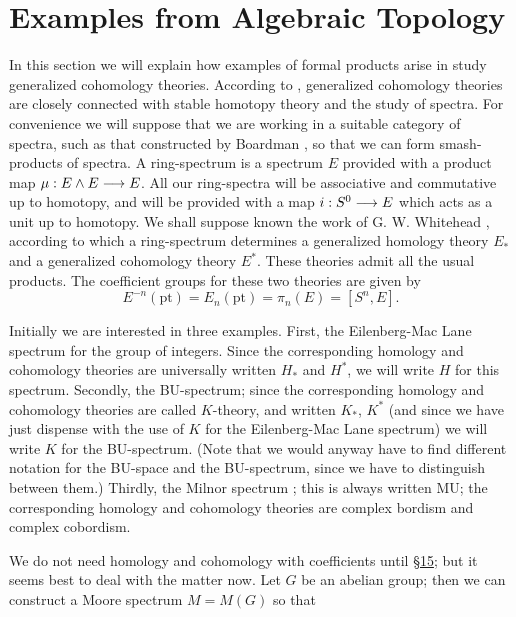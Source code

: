 \documentclass[../main]{subfiles}
\begin{document}
\label{sec:p2c2}

\chapter{Examples from Algebraic Topology}
In this section we will explain how examples of formal products arise in study generalized cohomology theories. According to \cite{whitehead}, generalized cohomology theories are closely connected with stable homotopy theory and the study of spectra. For convenience we will suppose that we are working in a suitable category of spectra, such as that constructed by Boardman \cite{boardman,boardman2}, so that we can form smash-products of spectra. A ring-spectrum is a spectrum $E$ provided with a product map $\mu : E \wedge E \overset{}{\longrightarrow} E$. All our ring-spectra will be associative and commutative up to homotopy, and will be provided with a map $i : S^0 \overset{}{\longrightarrow} E$ which acts as a unit up to homotopy. We shall suppose known the work of G. W. Whitehead \cite{whitehead}, according to which a ring-spectrum determines a generalized homology theory $E_\ast$ and a generalized cohomology theory $E^\ast$. These theories admit all the usual products. The coefficient groups for these two theories are given by $$E^{-n}(\mathrm{pt}) = E_n(\mathrm{pt}) = \pi_n(E) = [S^n, E].$$ 

Initially we are interested in three examples. First, the Eilenberg-Mac Lane spectrum for the group of integers. Since the corresponding homology and cohomology theories are universally written $H_\ast$ and $H^\ast$, we will write $H$ for this spectrum. Secondly, the BU-spectrum; since the corresponding homology and cohomology theories are called $K$-theory, and written $K_\ast$, $K^\ast$ (and since we have just dispense with the use of $K$ for the Eilenberg-Mac Lane spectrum) we will write $K$ for the BU-spectrum. (Note that we would anyway have to find different notation for the BU-space and the BU-spectrum, since we have to distinguish between them.) Thirdly, the Milnor spectrum \cite{milnor2}; this is always written MU; the corresponding homology and cohomology theories are complex bordism and complex cobordism. 

We do not need homology and cohomology with coefficients until \hyperref[sec:p2c15]{\S 15}; but it seems best to deal with the matter now. Let $G$ be an abelian group; then we can construct a Moore spectrum $M = M(G)$ so that 
\end{document}
